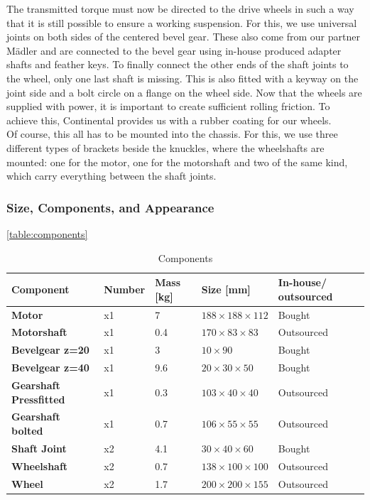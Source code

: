 The transmitted torque must now be directed to the drive wheels in such a way that it is still possible to ensure a working suspension. For this, we use universal joints on both sides of the centered bevel gear. These also come from our partner Mädler and are connected to the bevel gear using in-house produced adapter shafts and feather keys. To finally connect the other ends of the shaft joints to the wheel, only one last shaft is missing. This is also fitted with a keyway on the joint side and a bolt circle on a flange on the wheel side. Now that the wheels are supplied with power, it is important to create sufficient rolling friction. To achieve this, Continental provides us with a rubber coating for our wheels. \\
Of course, this all has to be mounted into the chassis. For this, we use three different types of brackets beside the knuckles, where the wheelshafts are mounted: one for the motor, one for the motorshaft and two of the same kind, which carry everything between the shaft joints.

\subsubsection{Size, Components, and Appearance}

\autoref{table:components}
\begin{table}[ht]
\centering
\begin{adjustbox}{width=\textwidth}
\begin{tabular}{|>{\bfseries}m{2.5cm}|m{1.4cm}|m{1.7cm}|m{2.9cm}|m{2.2cm}|}
\hline
Component & Number & Mass [kg] & Size [mm] &  In-house/ outsourced \\
\hline
Motor & x1 & 7 & \(188 \times 188 \times 112\) &   Bought \\
Motorshaft & x1 & 0.4 & \(170 \times 83\times 83\) &Outsourced \\
Bevelgear z=20 & x1 & 3 & \(10 \times 90\) &  Bought \\
Bevelgear z=40 & x1 & 9.6 & \(20 \times 30 \times 50\) &Bought \\
Gearshaft Pressfitted & x1 & 0.3 & \(103 \times 40 \times 40\) & Outsourced \\
Gearshaft bolted & x1 & 0.7 & \(106 \times 55 \times 55\) &Outsourced \\
Shaft Joint & x2 & 4.1 & \(30 \times 40 \times 60\) &  Bought \\
Wheelshaft & x2 & 0.7 & \(138 \times 100 \times 100\) &   Outsourced \\
Wheel & x2 & 1.7 & \(200 \times 200 \times 155\) &  Outsourced \\
\hline
\end{tabular}
\end{adjustbox}
\caption{Components}
\label{table:components}
\end{table}

